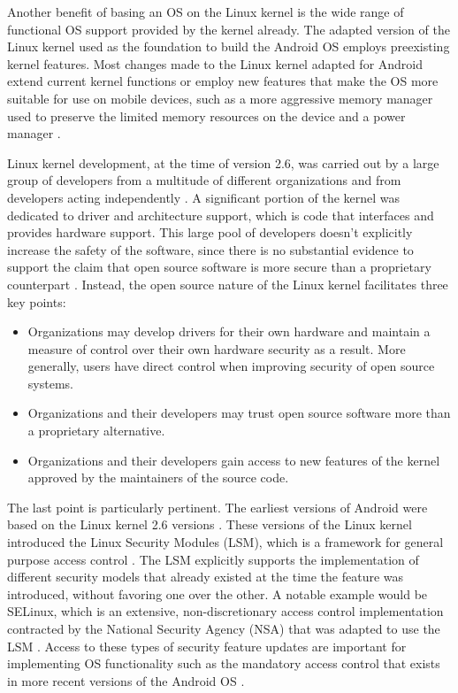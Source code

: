 Another benefit of basing an OS on the Linux kernel is the wide range of functional OS support provided by the kernel already.
The adapted version of the Linux kernel used as the foundation to build the Android OS employs preexisting kernel features.
Most changes made to the Linux kernel adapted for Android extend current kernel functions or employ new features that make the OS more suitable for use on mobile devices, such as a more aggressive memory manager used to preserve the limited memory resources on the device and a power manager \cite{AndroidDocs2022Arch, Khomh2012}.

Linux kernel development, at the time of version 2.6, was carried out by a large group of developers from a multitude of different organizations and from developers acting independently \cite{KroahHartman2007}.
A significant portion of the kernel was dedicated to driver and architecture support, which is code that interfaces and provides hardware support.
This large pool of developers doesn't explicitly increase the safety of the software, since there is no substantial evidence to support the claim that open source software is more secure than a proprietary counterpart \cite{Schryen2009, Witten2001}.
Instead, the open source nature of the Linux kernel facilitates three key points:
\begin{itemize}
    \item Organizations may develop drivers for their own hardware and maintain a measure of control over their own hardware security as a result. More generally, users have direct control when improving security of open source systems.
    \item Organizations and their developers may trust open source software more than a proprietary alternative.
    \item Organizations and their developers gain access to new features of the kernel approved by the maintainers of the source code.
\end{itemize}

The last point is particularly pertinent.
The earliest versions of Android were based on the Linux kernel 2.6 versions \cite{Gilski2015}.
These versions of the Linux kernel introduced the Linux Security Modules (LSM), which is a framework for general purpose access control \cite{Wright2002}.
The LSM explicitly supports the implementation of different security models that already existed at the time the feature was introduced, without favoring one over the other.
A notable example would be SELinux, which is an extensive, non-discretionary access control implementation contracted by the National Security Agency (NSA) that was adapted to use the LSM \cite{Smalley2001}.
Access to these types of security feature updates are important for implementing OS functionality such as the mandatory access control that exists in more recent versions of the Android OS \cite{AndroidDocs2022SELinux}.

